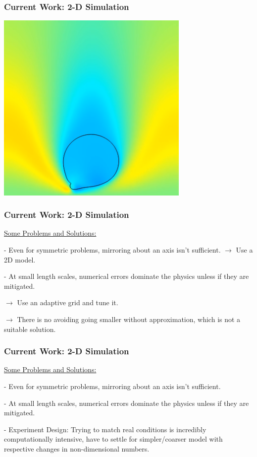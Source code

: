 \documentclass[12pt]{beamer}
\begin{document}
\begin{frame}
    \frametitle{Current Work: 2-D Simulation}

    \includegraphics[width=0.7\textwidth]{img/10-assymetry.png}
\end{frame}
\begin{frame}
    \frametitle{Current Work: 2-D Simulation}
    \underline{Some Problems and Solutions:}

    - Even for symmetric problems, mirroring about an axis isn't sufficient.
    $\rightarrow$ Use a 2D model.

    - At small length scales, numerical errors dominate the physics unless if 
    they are mitigated.

    $\rightarrow$ Use an adaptive grid and tune it.
    
    $\rightarrow$ There is no avoiding going smaller without approximation, 
    which is not a suitable solution.
\end{frame}
\begin{frame}
    \frametitle{Current Work: 2-D Simulation}
    \underline{Some Problems and Solutions:}

    - Even for symmetric problems, mirroring about an axis isn't sufficient.

    - At small length scales, numerical errors dominate the physics unless if 
    they are mitigated.
    
    - Experiment Design: Trying to match real conditions is incredibly 
    computationally intensive, have to settle for simpler/coarser model with 
    respective changes in non-dimensional numbers.
\end{frame}
\end{document}

